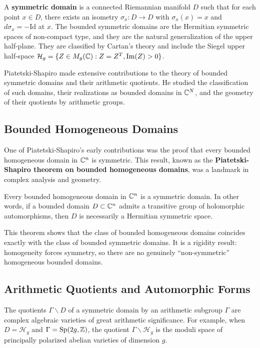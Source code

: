 A \textbf{symmetric domain} is a connected Riemannian manifold \(D\) such that for each point \(x \in D\), there exists an isometry \(\sigma_x: D \to D\) with \(\sigma_x(x) = x\) and \(d\sigma_x = -\mathrm{Id}\) at \(x\). The bounded symmetric domains are the Hermitian symmetric spaces of non-compact type, and they are the natural generalization of the upper half-plane. They are classified by Cartan's theory and include the Siegel upper half-space \(\mathcal{H}_g = \{Z \in M_g(\mathbb{C}): Z = Z^T, \operatorname{Im}(Z) > 0\}\).

Piatetski-Shapiro made extensive contributions to the theory of bounded symmetric domains and their arithmetic quotients. He studied the classification of such domains, their realizations as bounded domains in \(\mathbb{C}^N\), and the geometry of their quotients by arithmetic groups.

\subsection{Bounded Homogeneous Domains}

One of Piatetski-Shapiro's early contributions was the proof that every bounded homogeneous domain in \(\mathbb{C}^n\) is symmetric. This result, known as the \textbf{Piatetski-Shapiro theorem on bounded homogeneous domains}, was a landmark in complex analysis and geometry.

\begin{theorem}
Every bounded homogeneous domain in \(\mathbb{C}^n\) is a symmetric domain. In other words, if a bounded domain \(D \subset \mathbb{C}^n\) admits a transitive group of holomorphic automorphisms, then \(D\) is necessarily a Hermitian symmetric space.
\end{theorem}

This theorem shows that the class of bounded homogeneous domains coincides exactly with the class of bounded symmetric domains. It is a rigidity result: homogeneity forces symmetry, so there are no genuinely ``non-symmetric'' homogeneous bounded domains.

\subsection{Arithmetic Quotients and Automorphic Forms}

The quotients \(\Gamma \backslash D\) of a symmetric domain by an arithmetic subgroup \(\Gamma\) are complex algebraic varieties of great arithmetic significance. For example, when \(D = \mathcal{H}_g\) and \(\Gamma = \operatorname{Sp}(2g,\mathbb{Z})\), the quotient \(\Gamma \backslash \mathcal{H}_g\) is the moduli space of principally polarized abelian varieties of dimension \(g\).


